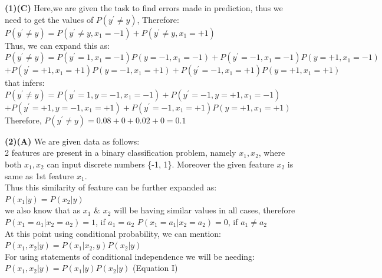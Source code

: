 \documentclass[11pt]{article}
\renewcommand\part[1]{\vspace{.10in}\textbf{(#1)}}
\begin{document}
\part{1}\textbf{(C)} Here,we are given the task to find errors made in prediction, thus we need to get the values of $P(y^\prime \neq y)$, Therefore:\\
$P(y^\prime \neq y) = P(y^\prime \neq y, x_1 = -1) + P(y^\prime \neq y, x_1 = +1)$\\
Thus, we can expand this as:\\
$P(y^\prime \neq y) = P(y^\prime = 1,x_1 = -1)P(y=-1,x_1=-1) + P(y^\prime =-1,x_1 = -1)P(y=+1,x_1=-1)$\\
$ + P(y^\prime = +1, x_1 = +1)P(y=-1, x_1 = +1) + P(y^\prime = -1, x_1 = +1)P(y=+1, x_1 = +1)$\\
that infers:\\
  $P(y^\prime \neq y) = P(y^\prime = 1,y=-1,x_1 = -1) + P(y^\prime =-1,y=+1,x_1 = -1)$ \newline
	$ + P(y^\prime = +1,y=-1, x_1 = +1) + P(y^\prime = -1, x_1 = +1)P(y=+1, x_1 = +1)$ \newline
Therefore,  $P(y^\prime \neq y) = 0.08 + 0 + 0.02 + 0 = 0.1 $


\part{2}\textbf{(A)} We are given data as follows:\\
2 features are present in a binary classification problem, namely $x_1,x_2$, where both $x_1,x_2$ can input discrete numbers \{-1, 1\}. Moreover the given feature $x_2$ is same as 1st feature $x_1$.\\
Thus this similarity of feature can be further expanded as:\\
$P(x_1 |y) = P(x_2|y)$\\

we also know that as $x_1$ \& $x_2$ will be having similar values in all cases, therefore\\
	$P(x_1 = a_1 | x_2 = a_2) = 1$, if $a_1 = a_2$ \newline
	$P(x_1 = a_1 | x_2 = a_2) = 0$, if $a_1 \neq a_2$\\
At this point using conditional probability, we can mention:\\
$P(x_1,x_2 | y) = P(x_1 | x_2,y) P(x_2 | y)$\\
For using statements of conditional independence we will be needing:\\
$P(x_1,x_2 | y) = P(x_1 | y) P(x_2|y)$ (Equation I)\\
\end{document}
